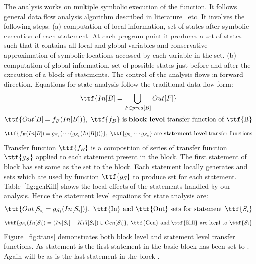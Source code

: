 The analysis works on multiple symbolic execution of the function. 
It follows general data flow analysis algorithm described in literature~\cite{Kam76globaldata, Muchnick97, Cooper02, Khedker09} etc.
It involves the following steps: (a) computation of local information, set of states after symbolic execution of each statement. At 
each program point it produces a set of states such that it contains all local and global 
variables and conservative approximation of symbolic locations accessed by each variable in the set. 
(b) computation of global information, set of possible states just before and after the execution of a block of statements. 
The control of the analysis flows in forward direction. Equations for state analysis follow the traditional data flow form: 
\begin{equation}
\ttf{In[B] = \bigcup_{P\in pred[B]}Out[P]}
\end{equation}
\begin{equation}
\ttf{Out[B] = f_B(In[B])},\   \mbox{$\ttf{f_B}$ is {\bf block level} transfer function of \ttf{B}}
\end{equation}
\begin{equation}
\ttf{f_B(In[B]) = g_{S_k}(\cdots(g_{S_1}(In[B])))},\   \mbox{$\ttf{g_{S_1}\cdots{g_{S_k}}}$ are {\bf statement level} transfer functions}
\end{equation}
Transfer function $\ttf{f_B}$ is a composition of series of 
transfer function $\ttf{g_S}$ applied to each statement present 
in the block. The first statement  of block  has 
 set same as the  set to the block. Each statement 
locally generates  and  sets which are used by 
function $\ttf{g_S}$ to produce  set for each statement. 
Table~\ref{fig:genKill} shows the local effects of the statements 
handled by our analysis. Hence the statement level equations for state analysis are:
\begin{equation}
\ttf{Out[S_i] = g_{S_i}(In[S_i])},\  \mbox{\ttf{In} and \ttf{Out} sets for statement $\ttf{S_i}$}
\end{equation}
\begin{equation}
\ttf{g_{S_i}(In[S_i]) = (In[S_i]-Kill[S_i])\cup Gen[S_i]},\  \mbox{\ttf{Gen} and \ttf{Kill} are local to $\ttf{S_i}$}
\end{equation}
Figure~\ref{fig:trans} demonstrates both block level and statement 
level transfer functions. As statement  is the first 
statement in the basic block   has been 
set to . Again  will be 
 as  is the last statement in the block . 

